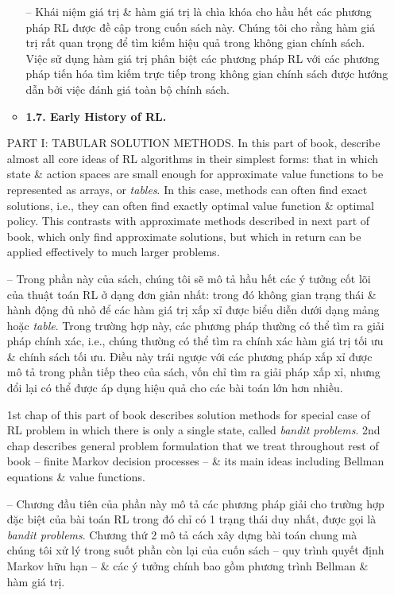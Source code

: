 \documentclass{article}
\begin{document}
\begin{itemize}
\begin{itemize}
        -- Khái niệm giá trị \& hàm giá trị là chìa khóa cho hầu hết các phương pháp RL được đề cập trong cuốn sách này. Chúng tôi cho rằng hàm giá trị rất quan trọng để tìm kiếm hiệu quả trong không gian chính sách. Việc sử dụng hàm giá trị phân biệt các phương pháp RL với các phương pháp tiến hóa tìm kiếm trực tiếp trong không gian chính sách được hướng dẫn bởi việc đánh giá toàn bộ chính sách.
        \item {\bf1.7. Early History of RL.}
    \end{itemize}

    PART I: TABULAR SOLUTION METHODS. In this part of book, describe almost all core ideas of RL algorithms in their simplest forms: that in which state \& action spaces are small enough for approximate value functions to be represented as arrays, or {\it tables}. In this case, methods can often find exact solutions, i.e., they can often find exactly optimal value function \& optimal policy. This contrasts with approximate methods described in next part of book, which only find approximate solutions, but which in return can be applied effectively to much larger problems.

    -- Trong phần này của sách, chúng tôi sẽ mô tả hầu hết các ý tưởng cốt lõi của thuật toán RL ở dạng đơn giản nhất: trong đó không gian trạng thái \& hành động đủ nhỏ để các hàm giá trị xấp xỉ được biểu diễn dưới dạng mảng hoặc {\it table}. Trong trường hợp này, các phương pháp thường có thể tìm ra giải pháp chính xác, i.e., chúng thường có thể tìm ra chính xác hàm giá trị tối ưu \& chính sách tối ưu. Điều này trái ngược với các phương pháp xấp xỉ được mô tả trong phần tiếp theo của sách, vốn chỉ tìm ra giải pháp xấp xỉ, nhưng đổi lại có thể được áp dụng hiệu quả cho các bài toán lớn hơn nhiều.

    1st chap of this part of book describes solution methods for special case of RL problem in which there is only a single state, called {\it bandit problems}. 2nd chap describes general problem formulation that we treat throughout rest of book -- finite Markov decision processes -- \& its main ideas including Bellman equations \& value functions.

    -- Chương đầu tiên của phần này mô tả các phương pháp giải cho trường hợp đặc biệt của bài toán RL trong đó chỉ có 1 trạng thái duy nhất, được gọi là {\it bandit problems}. Chương thứ 2 mô tả cách xây dựng bài toán chung mà chúng tôi xử lý trong suốt phần còn lại của cuốn sách -- quy trình quyết định Markov hữu hạn -- \& các ý tưởng chính bao gồm phương trình Bellman \& hàm giá trị.


\end{itemize}
\end{document}
